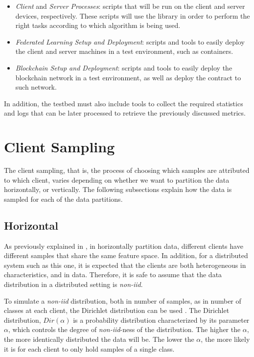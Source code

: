 \begin{itemize}
    \item \textit{Client} and \textit{Server Processes}: scripts that will be run on the client and server devices, respectively. These scripts will use the library in order to perform the right tasks according to which algorithm is being used.
    
    \item \textit{Federated Learning Setup and Deployment}: scripts and tools to easily deploy the client and server machines in a test environment, such as containers.
    
    \item \textit{Blockchain Setup and Deployment}: scripts and tools to easily deploy the blockchain network in a test environment, as well as deploy the contract to such network.
\end{itemize}

In addition, the testbed must also include tools to collect the required statistics and logs that can be later processed to retrieve the previously discussed metrics.

\section{Client Sampling}\label{meth:client_sampling}

The client sampling, that is, the process of choosing which samples are attributed to which client, varies depending on whether we want to partition the data horizontally, or vertically. The following subsections explain how the data is sampled for each of the data partitions.

\subsection{Horizontal}

As previously explained in , in horizontally partition data, different clients have different samples that share the same feature space. In addition, for a distributed system such as this one, it is expected that the clients are both heterogeneous in characteristics, and in data. Therefore, it is safe to assume that the data distribution in a distributed setting is \textit{non-iid}.

To simulate a \textit{non-iid} distribution, both in number of samples, as in number of classes at each client, the Dirichlet distribution can be used \cite{tim, 10.48550/arxiv.2006.07242}. The Dirichlet distribution, $Dir(\alpha)$ is a probability distribution characterized by its parameter $\alpha$, which controls the degree of \textit{non-iid}-ness of the distribution. The higher the $\alpha$, the more identically distributed the data will be. The lower the $\alpha$, the more likely it is for each client to only hold samples of a single class.

